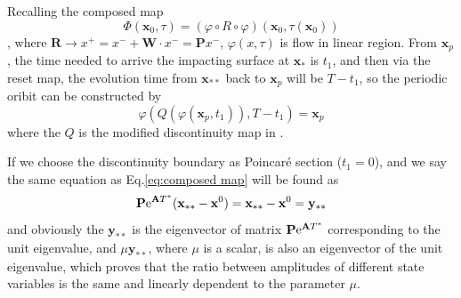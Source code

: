 \documentclass[a4paper,10pt]{article}
\begin{document}
Recalling the composed map 
\[
\Phi (\mathbf{x}_0,\tau) =( \varphi \circ R  \circ \varphi) \left(\mathbf{x}_0, \tau(\mathbf{x}_0)\right)  \] ,  where $\mathbf{R} \rightarrow x^{+}=x^- + \mathbf{W} \cdot x^{-}=\mathbf{P} x^-$, $\varphi(x, \tau) $  is flow in linear region.
From $\mathbf{x}_p$, the time needed  to arrive the impacting surface at $\mathbf{x}_*$ is $t_1$, and then via the reset map, the evolution time from $\mathbf{x}_{**}$ back to $\mathbf{x}_p$ will be $T-t_1$, so the periodic oribit can be constructed by  
\begin{equation} \varphi ( Q(\varphi (\mathbf{x}_p,t_1)),T-t_1)=\mathbf{x}_p
	\label{eq:composed map}
\end{equation}
where the $Q$ is the modified discontinuity map in \cite{Bernardo2007}. 



If we choose the discontinuity boundary as Poincar{\'e} section ($t_1=0$), and we say  the same equation as Eq.\ref{eq:composed map} will be found as 
\begin{equation}
	\mathbf{P}{\rm e}^{\mathbf{A} T^*} (\mathbf{x_{**}}-\mathbf{x}^0) = \mathbf{x_{**}} - \mathbf{x}^0 = \mathbf{y}_{**}
\end{equation}
and obviously the $\mathbf{y_{**}}$ is the eigenvector of matrix $\mathbf{P}{\rm e}^{\mathbf{A} T^*} $ corresponding to the unit eigenvalue, and $\mu \mathbf{y_{**}}$, where $\mu$ is a scalar, is also an eigenvector of the unit eigenvalue, which proves that the ratio between amplitudes of different state variables is the same and linearly dependent to the parameter $\mu$.
\end{document}
